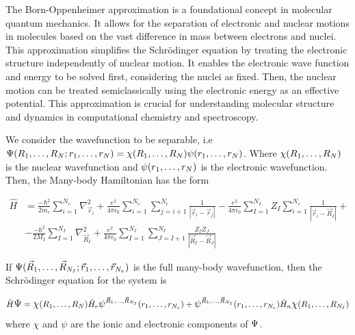 \documentclass[10pt]{article}
\numberwithin{equation}{section}
\theoremstyle{defi}
\begin{document}
\begin{definitionii}
The Born-Oppenheimer approximation is a foundational concept in molecular quantum mechanics. It allows for the separation of electronic and nuclear motions in molecules based on the vast difference in mass between electrons and nuclei. This approximation simplifies the Schrödinger equation by treating the electronic structure independently of nuclear motion. It enables the electronic wave function and energy to be solved first, considering the nuclei as fixed. Then, the nuclear motion can be treated semiclassically using the electronic energy as an effective potential. This approximation is crucial for understanding molecular structure and dynamics in computational chemistry and spectroscopy.
\end{definitionii}

We consider the wavefunction to be separable, i.e $\mathlarger{\Psi}(R_1, \dots, R_N; r_1, \dots, r_N)= \mathlarger{\chi}(R_1, \dots, R_N)\mathlarger{\psi}(r_1, \dots, r_N)$.  Where $\mathlarger{\chi}(R_1, \dots, R_N)$ is the nuclear wavefunction and $\mathlarger{\psi}(r_1, \dots, r_N)$ is the electronic wavefunction. Then, the Many-body Hamiltonian has the form

\begin{align}
  \label{eq:3}
  \hat{H} &= \frac{-\hbar^2}{2m_e}\sum_{i=1}^{N_e} \nabla_{\vec{r}_i}^2 + \frac{e^2}{4\pi\epsilon_0}\sum_{i=1}^{N_e}\sum_{j=i+1}^{N_e}\frac{1}{|\vec{r}_i - \vec{r}_j|} - 
  \frac{e^2}{4\pi\epsilon_0}\sum_{I=1}^{N_I}Z_I\sum_{i=1}^{N_e}\frac{1}{|\vec{r}_i - \vec{R}_I|} + \nonumber\\ 
  &- \frac{-\hbar^2}{2M_I}\sum_{I=1}^{N_I} \nabla_{\vec{R}_I}^2 + \frac{e^2}{4\pi\epsilon_0}\sum_{I=1}^{N_I}\sum_{J=I+1}^{N_I}\frac{Z_IZ_J}{|\vec{R}_I - \vec{R}_J|} 
\end{align}

If $\mathlarger{\Psi}(\vec{R}_1,\dots, \vec{R}_{N_I}; \vec{r}_1,\dots, \vec{r}_{N_e})$ is the full many-body wavefunction, then the Schrödinger equation for the system is 

\begin{equation}
  \label{eq:4}
  \hat{H}\mathlarger{\Psi} = \mathlarger{\chi}(R_1, \dots, R_N) \hat{H}_e\mathlarger{\psi}^{\vec{R}_1, \dots, \vec{R}_{N_I}}(r_1, \dots, r_{N_e})
  + \mathlarger{\psi}^{\vec{R}_1, \dots, \vec{R}_{N_I}}(r_1, \dots, r_{N_e})\hat{H}_n\mathlarger{\chi}(R_1, \dots, R_{N_I})
  \end{equation}
 where $\chi$ and $\psi$  are the ionic and electronic components of $\mathlarger{\Psi}$. 
\end{document}
